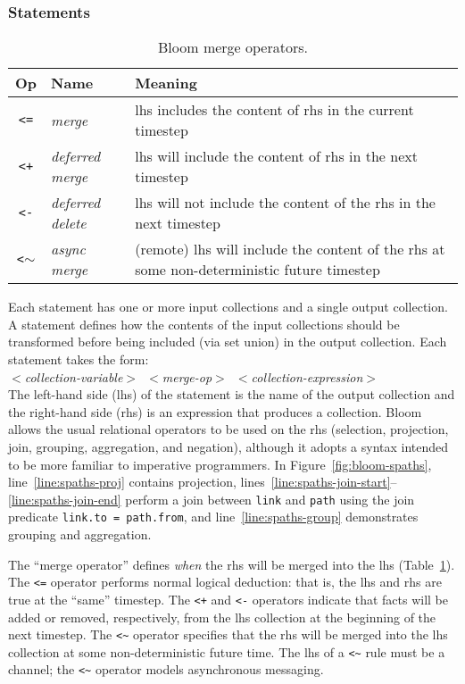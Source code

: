 \subsubsection{Statements}
\begin{table}
\begin{tabular}{|c|l|p{1.85in}|}
\hline
\textbf{Op} & \textbf{Name} & \textbf{Meaning} \\
\hline
\verb|<=| & \emph{merge} & lhs includes the content of rhs in the
current timestep \\
\hline
\verb|<+| & \emph{deferred merge} & lhs will include the content of rhs in the
next timestep \\
\hline
\verb|<-| & \emph{deferred delete} & lhs will not include the content of the rhs
in the next timestep \\
\hline
\verb|<|$\sim$ & \emph{async merge} & (remote) lhs will include the content of the
rhs at some non-deterministic future timestep\\
\hline
\end{tabular}
\caption{Bloom merge operators.}
\label{tbl:bloom-ops}
\end{table}

Each statement has one or more input collections and a single output
collection. A statement defines how the contents of the input collections should
be transformed before being included (via set union) in the output
collection. Each statement takes the form: \\ \noindent
\mbox{\hspace{0.25in}\emph{$<$collection-variable$>$ $<$merge-op$>$
    $<$collection-expression$>$}}\\ \noindent The left-hand side (lhs) of the
statement is the name of the output collection and the right-hand side (rhs) is
an expression that produces a collection. Bloom allows the usual relational
operators to be used on the rhs (selection, projection, join, grouping,
aggregation, and negation), although it adopts a syntax intended to be more
familiar to imperative programmers. In Figure~\ref{fig:bloom-spaths},
line~\ref{line:spaths-proj} contains projection,
lines~\ref{line:spaths-join-start}--\ref{line:spaths-join-end} perform a join
between \texttt{link} and \texttt{path} using the join predicate
\verb+link.to = path.from+, and line~\ref{line:spaths-group} demonstrates
grouping and aggregation.

The ``merge operator'' defines \emph{when} the rhs will be merged into the lhs
(Table~\ref{tbl:bloom-ops}). The \verb|<=| operator performs normal logical
deduction: that is, the lhs and rhs are true at the ``same'' timestep. The
\verb|<+| and \verb|<-| operators indicate that facts will be added or removed,
respectively, from the lhs collection at the beginning of the next timestep. The
\verb+<~+ operator specifies that the rhs will be merged into the lhs collection
at some non-deterministic future time. The lhs of a \verb+<~+ rule must be a
channel; the \verb+<~+ operator models asynchronous messaging.


